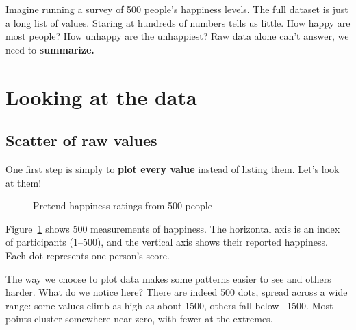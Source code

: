 \documentclass[
  letterpaper,
  DIV=11,
  numbers=noendperiod]{scrreprt}
\begin{document}
Imagine running a survey of 500 people's happiness levels. The full
dataset is just a long list of values. Staring at hundreds of numbers
tells us little. How happy are most people? How unhappy are the
unhappiest? Raw data alone can't answer, we need to \textbf{summarize.}

\section{Looking at the data}\label{looking-at-the-data}

\subsection{Scatter of raw values}\label{scatter-of-raw-values}

One first step is simply to \textbf{plot every value} instead of listing
them. Let's look at them!

\begin{figure}


\caption{\label{fig-happyPlot}Pretend happiness ratings from 500 people}

\end{figure}%

Figure~\ref{fig-happyPlot} shows 500 measurements of happiness. The
horizontal axis is an index of participants (1--500), and the vertical
axis shows their reported happiness. Each dot represents one person's
score.

The way we choose to plot data makes some patterns easier to see and
others harder. What do we notice here? There are indeed 500 dots, spread
across a wide range: some values climb as high as about 1500, others
fall below --1500. Most points cluster somewhere near zero, with fewer
at the extremes.
\end{document}
